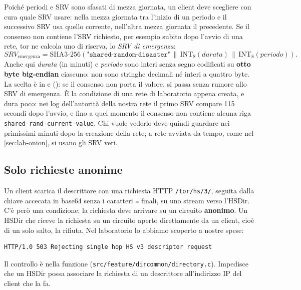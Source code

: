 \begin{approfondimento}
Poiché periodi e SRV sono sfasati di mezza giornata, un client deve scegliere con cura quale SRV usare: nella mezza giornata tra l'inizio di un periodo e il successivo SRV usa quello corrente, nell'altra mezza giornata il precedente. Se il consenso non contiene l'SRV richiesto, per esempio subito dopo l'avvio di una rete, tor ne calcola uno di riserva, lo \emph{SRV di emergenza}:
\[
\mathit{SRV}_{\mathrm{emergenza}} =
\mathrm{SHA3\text{-}256}(\texttt{"shared-random-disaster"} \,\|\,
\mathrm{INT}_8(\mathit{durata}) \,\|\, \mathrm{INT}_8(\mathit{periodo})).
\]
Anche qui \emph{durata} (in minuti) e \emph{periodo} sono interi
senza segno codificati su \textbf{otto byte big-endian} ciascuno:
non sono stringhe decimali né interi a quattro byte.
La scelta è in  e  (): se il consenso non porta il valore, si passa senza rumore allo SRV di emergenza. È la condizione di una rete di laboratorio appena creata, e dura poco: nei log dell'autorità della nostra rete il primo SRV compare 115 secondi dopo l'avvio, e fino a quel momento il consenso non contiene alcuna riga \texttt{shared-rand-current-value}. Chi vuole vederlo deve quindi guardare nei primissimi minuti dopo la creazione della rete; a rete avviata da tempo, come nel \cref{sec:lab-onion}, si usano gli SRV veri.
\end{approfondimento}

\subsection{Solo richieste anonime}

Un client scarica il descrittore con una richiesta HTTP \nolinkurl{/tor/hs/3/}, seguita dalla chiave accecata in base64 senza i caratteri \texttt{=} finali, su uno stream  verso l'HSDir. C'è però una condizione: la richiesta deve arrivare su un circuito \textbf{anonimo}. Un HSDir che riceve la richiesta su un circuito aperto direttamente da un client, cioè di un solo salto, la rifiuta. Nel laboratorio lo abbiamo scoperto a nostre spese:
\begin{lstlisting}[numbers=none]
HTTP/1.0 503 Rejecting single hop HS v3 descriptor request
\end{lstlisting}
Il controllo è nella funzione  (\nolinkurl{src/feature/dircommon/directory.c}). Impedisce che un HSDir possa associare la richiesta di un descrittore all'indirizzo IP del client che la fa.

